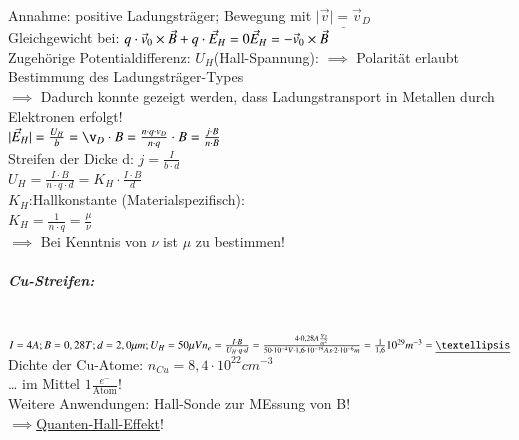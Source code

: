         Annahme: positive Ladungsträger; Bewegung mit $\underline{\vert \vec{v}\vert=\vec{v}_D}$\\
        Gleichgewicht bei: $q\cdot \vec{v}_0\times \vec{B}+q\cdot\vec{E}_H=0\\ \vec{E}_H=-\vec{v}_0\times\vec{B}$\\
        
        Zugehörige Potentialdifferenz: $ U_H $(Hall-Spannung):
        $\implies$ Polarität erlaubt Bestimmung des Ladungsträger-Types\\
        $\implies$ Dadurch konnte gezeigt werden, dass Ladungstransport in Metallen durch Elektronen erfolgt!\\
        
        $\vert \vec{E}_H\vert=\frac{U_H}{b}=\v_D\cdot B=\frac{n\cdot q\cdot v_D}{n\cdot q}\cdot B=\frac{j\cdot B}{n\cdot B}$\\
        
        Streifen der Dicke d: $j=\frac{I}{b\cdot d}$\\
        
        $U_H=\frac{I\cdot B}{n\cdot q\cdot d}=K_H\cdot\frac{I\cdot B}{d}$\\
        
        $ K_H $:Hallkonstante (Materialspezifisch):\\
        $\boxed{K_H=\frac{1}{n\cdot q}=\frac{\mu}{\nu}}$\\
        
        $\implies$ Bei Kenntnis von $\nu$ ist $\mu$ zu bestimmen!
        
        \subparagraph{Cu-Streifen:}\leavevmode \\
        
        $I=4A; B=0,28T; d=2,0\mu m; U_H=50\mu V\\
        n_e=\frac{I\cdot B}{U_H\cdot q\cdot d}=\frac{4\cdot 0,28 A\frac{Vs}{m^2}}{50\cdot 10^{-4}V\cdot 1,6\cdot 10^{-19}As\cdot 2\cdot 10^{-6}m}\\
        =\frac{1}{1,6}10^{29}m^{-3}\\
        =\underline{…}$\\
        
        Dichte der Cu-Atome: $n_{Cu}=8,4\cdot 10^{22}cm^{-3}$\\
        … im Mittel $1\frac{e^-}{\text{Atom}}!$\\
        Weitere Anwendungen: Hall-Sonde zur MEssung von B!\\
        $\implies$\underline{Quanten-Hall-Effekt}!\\
        
